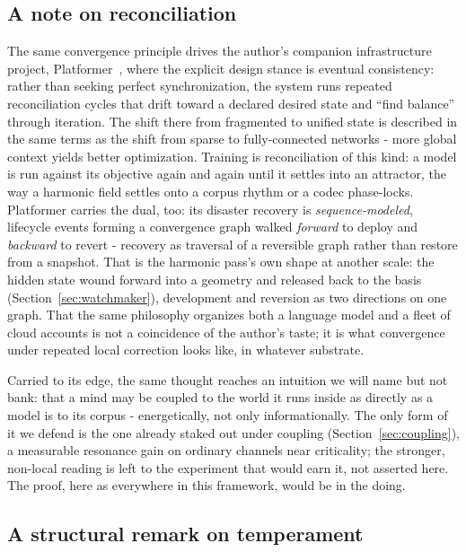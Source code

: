 \subsection{A note on reconciliation}

The same convergence principle drives the author's companion infrastructure project, Platformer~\cite{platformer2025}, where the explicit design stance is eventual consistency: rather than seeking perfect synchronization, the system runs repeated reconciliation cycles that drift toward a declared desired state and ``find balance'' through iteration. The shift there from fragmented to unified state is described in the same terms as the shift from sparse to fully-connected networks - more global context yields better optimization. Training is reconciliation of this kind: a model is run against its objective again and again until it settles into an attractor, the way a harmonic field settles onto a corpus rhythm or a codec phase-locks. Platformer carries the dual, too: its disaster recovery is \textit{sequence-modeled}, lifecycle events forming a convergence graph walked \textit{forward} to deploy and \textit{backward} to revert - recovery as traversal of a reversible graph rather than restore from a snapshot. That is the harmonic pass's own shape at another scale: the hidden state wound forward into a geometry and released back to the basis (Section~\ref{sec:watchmaker}), development and reversion as two directions on one graph. That the same philosophy organizes both a language model and a fleet of cloud accounts is not a coincidence of the author's taste; it is what convergence under repeated local correction looks like, in whatever substrate.

Carried to its edge, the same thought reaches an intuition we will name but not bank: that a mind may be coupled to the world it runs inside as directly as a model is to its corpus - energetically, not only informationally. The only form of it we defend is the one already staked out under coupling (Section~\ref{sec:coupling}), a measurable resonance gain on ordinary channels near criticality; the stronger, non-local reading is left to the experiment that would earn it, not asserted here. The proof, here as everywhere in this framework, would be in the doing.

\subsection{A structural remark on temperament}

